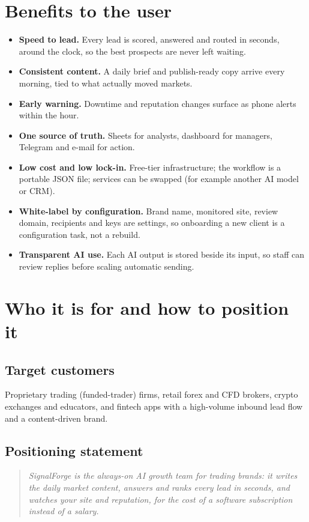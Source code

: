 \documentclass[11pt,a4paper]{article}
\begin{document}
\section{Benefits to the user}
\begin{itemize}
  \item \textbf{Speed to lead.} Every lead is scored, answered and routed in seconds, around the clock, so the best prospects are never left waiting.
  \item \textbf{Consistent content.} A daily brief and publish-ready copy arrive every morning, tied to what actually moved markets.
  \item \textbf{Early warning.} Downtime and reputation changes surface as phone alerts within the hour.
  \item \textbf{One source of truth.} Sheets for analysts, dashboard for managers, Telegram and e-mail for action.
  \item \textbf{Low cost and low lock-in.} Free-tier infrastructure; the workflow is a portable JSON file; services can be swapped (for example another AI model or CRM).
  \item \textbf{White-label by configuration.} Brand name, monitored site, review domain, recipients and keys are settings, so onboarding a new client is a configuration task, not a rebuild.
  \item \textbf{Transparent AI use.} Each AI output is stored beside its input, so staff can review replies before scaling automatic sending.
\end{itemize}

\section{Who it is for and how to position it}
\subsection{Target customers}
Proprietary trading (funded-trader) firms, retail forex and CFD brokers, crypto exchanges and
educators, and fintech apps with a high-volume inbound lead flow and a content-driven brand.

\subsection{Positioning statement}
\begin{quote}
\textit{SignalForge is the always-on AI growth team for trading brands: it writes the daily market
content, answers and ranks every lead in seconds, and watches your site and reputation, for the cost
of a software subscription instead of a salary.}
\end{quote}
\end{document}
